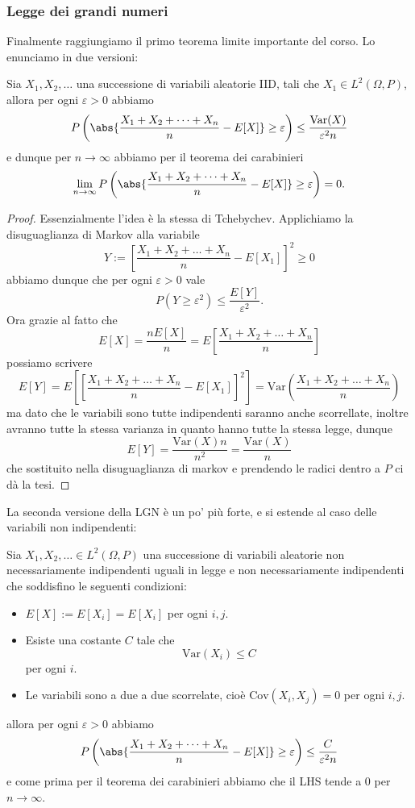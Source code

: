 \documentclass[11pt]{scrartcl}
\begin{document}
	\subsubsection{Legge dei grandi numeri}
	Finalmente raggiungiamo il primo teorema limite importante del corso. Lo enunciamo in due versioni:
	\begin{theorem}
		Sia $X_1,X_2,\dots$ una successione di variabili aleatorie IID, tali che $X_1\in L^2(\Omega,P)$, allora per ogni $\varepsilon>0$ abbiamo
		$$P\left(\abs{\frac{X_1+X_2+\dots+X_n}{n}-E[X]}\ge\varepsilon\right)\le \frac{\text{Var}(X)}{\varepsilon^2n}$$
		e dunque per $n\to\infty$ abbiamo per il teorema dei carabinieri
		$$\lim_{n\to\infty}P\left(\abs{\frac{X_1+X_2+\dots+X_n}{n}-E[X]}\ge\varepsilon\right)=0.$$
	\end{theorem}
	\begin{proof}
		Essenzialmente l'idea è la stessa di Tchebychev. Applichiamo la disuguaglianza di Markov alla variabile
		$$Y:=\left[\frac{X_1+X_2+\dots+X_n}{n}-E[X_1]\right]^2\ge 0$$
		abbiamo dunque che per ogni $\varepsilon>0$ vale
		$$P\left(Y\ge \varepsilon^2\right)\le \frac{E[Y]}{\varepsilon^2}.$$
		Ora grazie al fatto che
		$$E[X]=\frac{nE[X]}{n}=E\left[\frac{X_1+X_2+\dots+X_n}{n}\right]$$ 
		possiamo scrivere
		$$E[Y]=E\left[\left[\frac{X_1+X_2+\dots+X_n}{n}-E[X_1]\right]^2\right]=\text{Var}\left(\frac{X_1+X_2+\dots+X_n}{n}\right)$$
		ma dato che le variabili sono tutte indipendenti saranno anche scorrellate, inoltre avranno tutte la stessa varianza in quanto hanno tutte la stessa legge, dunque
		$$E[Y]=\frac{\text{Var}(X)n}{n^2}=\frac{\text{Var}(X)}{n}$$
		che sostituito nella disuguaglianza di markov e prendendo le radici dentro a $P$ ci dà la tesi.
	\end{proof}
	La seconda versione della LGN è un po' più forte, e si estende al caso delle variabili non indipendenti:
	\begin{theorem}
		Sia $X_1,X_2,\dots\in L^2(\Omega,P)$ una successione di variabili aleatorie non necessariamente indipendenti uguali in legge e non necessariamente indipendenti che soddisfino le seguenti condizioni:
		\begin{itemize}
			\item $E[X]:=E[X_i]=E[X_i]$ per ogni $i,j$.
			\item Esiste una costante $C$ tale che 
			$$\text{Var}(X_i)\le C$$
			per ogni $i$.
			\item Le variabili sono a due a due scorrelate, cioè $\text{Cov}(X_i,X_j)=0$ per ogni $i,j$.
		\end{itemize}
		allora per ogni $\varepsilon>0$ abbiamo
		$$P\left(\abs{\frac{X_1+X_2+\dots+X_n}{n}-E[X]}\ge \varepsilon\right)\le \frac{C}{\varepsilon^2n}$$
		e come prima per il teorema dei carabinieri abbiamo che il LHS tende a $0$ per $n\to\infty$.
	\end{theorem}
\end{document}
